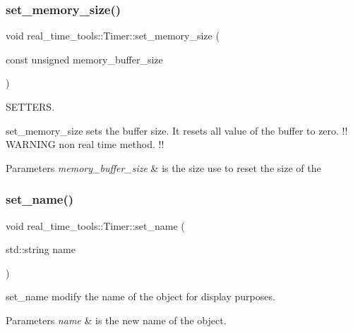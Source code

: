 \subsubsection{\texorpdfstring{set\+\_\+memory\+\_\+size()}{set\_memory\_size()}}
{\footnotesize\ttfamily void real\+\_\+time\+\_\+tools\+::\+Timer\+::set\+\_\+memory\+\_\+size (\begin{DoxyParamCaption}\item[{const unsigned}]{memory\+\_\+buffer\+\_\+size }\end{DoxyParamCaption})\hspace{0.3cm}{\ttfamily [inline]}}



S\+E\+T\+T\+E\+RS. 

set\+\_\+memory\+\_\+size sets the buffer size. It resets all value of the buffer to zero. !! W\+A\+R\+N\+I\+NG non real time method. !! 
\begin{DoxyParams}{Parameters}
{\em memory\+\_\+buffer\+\_\+size} & is the size use to reset the size of the \\
\hline
\end{DoxyParams}
\mbox{\label{classreal__time__tools_1_1Timer_a1005cc3c2d7e68ab6d97c8d3167c7f93}} 
\subsubsection{\texorpdfstring{set\+\_\+name()}{set\_name()}}
{\footnotesize\ttfamily void real\+\_\+time\+\_\+tools\+::\+Timer\+::set\+\_\+name (\begin{DoxyParamCaption}\item[{std\+::string}]{name }\end{DoxyParamCaption})\hspace{0.3cm}{\ttfamily [inline]}}



set\+\_\+name modify the name of the object for display purposes. 


\begin{DoxyParams}{Parameters}
{\em name} & is the new name of the object. \\
\hline
\end{DoxyParams}
\mbox{\label{classreal__time__tools_1_1Timer_a705486df1486d737ac30a04ecf7e2b97}} 
